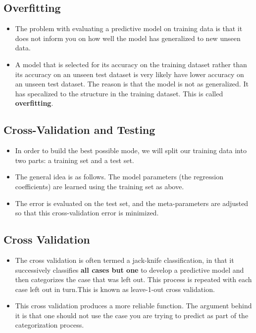 \documentclass[a4paper,12pt]{article}
\begin{document}
\subsection{Overfitting}
\begin{itemize}
	\item The problem with evaluating a predictive model on training data is that it does not inform you on how well the model has generalized to new unseen data.
	
\item 	A model that is selected for its accuracy on the training dataset rather than its accuracy on an unseen test dataset is very likely have lower accuracy on an unseen test dataset. The reason is that the model is not as generalized. It has specalized to the structure in the training dataset. This is called \textbf{overfitting}.
\end{itemize}

\subsection{Cross-Validation and Testing}
\begin{itemize}
	\item In order to build the best possible mode, we will split our training data into two parts: a training set and a test set. 
	
	\item 	The general idea is as follows. The model parameters (the regression coefficients) are learned using the training set as above. 
	\item The error is evaluated on the test set, and the meta-parameters are adjusted so that this cross-validation error is minimized. 

\end{itemize}	
\subsection{Cross Validation}
\begin{itemize}	
%	
	\item The cross validation is often termed a jack-knife classification, in that
	it successively classifies \textbf{all cases but one} to develop a predictive model and then
	categorizes the case that was left out. This process is repeated with each case left out in
	turn.This is known as leave-1-out cross validation. 
	
	\item 	This cross validation produces a more reliable function. The argument behind it is that
	one should not use the case you are trying to predict as part of the categorization process.
\end{itemize}
\end{document}

